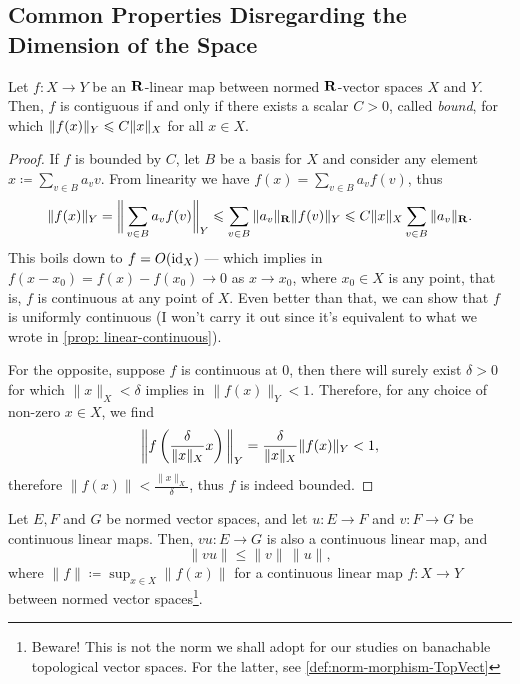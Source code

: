 
\subsection{Common Properties Disregarding the Dimension of the Space}

\begin{proposition}
\label{prop:continous-linear-thus-bounded}
Let \(f: X \to Y\) be an \(\mathbf{R}\)-linear map between normed \(\mathbf{R}\)-vector spaces
\(X\) and \(Y\). Then, \(f\) is contiguous if and only if there exists a scalar
\(C > 0\), called \emph{bound}, for which \(\lVert f(x)\rVert_Y \leqslant C \lVert x\rVert_{X}\)
for all \(x \in X\).
\end{proposition}

\begin{proof}
If \(f\) is bounded by \(C\), let \(B\) be a basis for \(X\) and consider any
element \(x \coloneq \sum_{v \in B} a_{v} v\). From linearity we have \(f(x) =
\sum_{v \in B} a_v f(v)\), thus
\[
  \| f(x) \|_Y = \bigg\| \sum_{v \in B} a_v f(v) \bigg\|_{Y}
  \leqslant \sum_{v \in B} \| a_v \|_{\mathbf{R}} \| f(v) \|_{Y}
  \leqslant C \|x\|_{X} \sum_{v \in B} \|a_v\|_{\mathbf{R}}.
\]
This boils down to \(f = O(\operatorname{id}_{X})\) --- which implies in \(f(x - x_0) = f(x) -
f(x_0) \to 0\) as \(x \to x_0\), where \(x_0 \in X\) is any point, that is,
\(f\) is continuous at any point of \(X\). Even better than that, we can show
that \(f\) is uniformly continuous (I won't carry it out since it's equivalent to
what we wrote in \cref{prop: linear-continuous}).

For the opposite, suppose \(f\) is continuous at \(0\), then there will surely
exist \(\delta > 0\) for which \(\|x\|_X < \delta\) implies in
\(\|f(x)\|_Y < 1\). Therefore, for any choice of non-zero \(x \in X\), we
find
\[
  \bigg\| f \left( \frac{\delta}{\lVert x\rVert_X} x \right) \bigg\|_Y
  = \frac{\delta}{\| x \|_X} \| f(x) \|_{Y} < 1,
\]
therefore \(\| f(x) \| < \frac{\| x \|_{X}}{\delta}\), thus \(f\) is indeed
bounded.
\end{proof}

\begin{proposition}
\label{prop:composition-banach-morphisms}
Let \(E, F\) and \(G\) be normed vector spaces, and let \(u: E \to F\) and \(v:
F \to G\) be continuous linear maps. Then, \(v u: E \to G\) is also a continuous
linear map, and
\[
  \|v u\| \leq \|v\|\, \|u\|,
\]
where \(\|f\| \coloneq \sup_{x \in X} \|f(x)\|\) for a continuous linear
map \(f: X \to Y\) between normed vector spaces\footnote{Beware! This is not the
norm we shall adopt for our studies on banachable topological vector spaces. For
the latter, see \cref{def:norm-morphism-TopVect}}.
\end{proposition}

